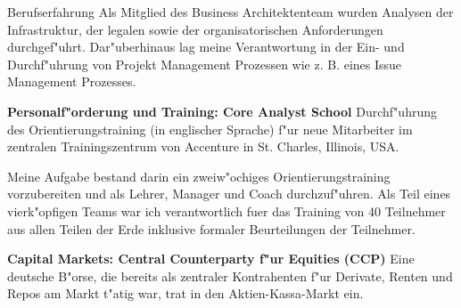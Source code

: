 \begin{rubric}{Berufserfahrung}
Als Mitglied des Business Architektenteam wurden Analysen der Infrastruktur, der legalen sowie der organisatorischen Anforderungen durchgef"uhrt. Dar"uberhinaus lag meine Verantwortung in der Ein- und Durchf"uhrung von Projekt Management Prozessen wie z. B. eines Issue Management Prozesses.

\entry*[06/2003 - 07/2003] \textbf{Personalf"orderung und Training: Core Analyst School}\newline
{} 
Durchf"uhrung des Orientierungstraining (in englischer Sprache) f"ur neue Mitarbeiter im zentralen Trainingszentrum von  Accenture in St. Charles, Illinois, USA.\axelvspace

Meine Aufgabe bestand darin ein zweiw"ochiges Orientierungstraining vorzubereiten und als Lehrer, Manager und Coach durchzuf"uhren. Als Teil eines vierk"opfigen Teams war ich verantwortlich fuer das Training von 40 Teilnehmer aus allen Teilen der Erde inklusive formaler Beurteilungen der Teilnehmer.

\entry*[12/2001 - 06/2003] \textbf{Capital Markets: Central Counterparty f"ur Equities (CCP)}\newline
{} 
Eine deutsche B"orse, die bereits als zentraler Kontrahenten f"ur Derivate, Renten und Repos am Markt t"atig war, trat in den Aktien-Kassa-Markt ein. %


\end{rubric}
